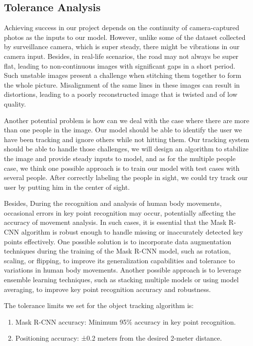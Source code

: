 \subsection{Tolerance Analysis}
Achieving success in our project depends on the continuity of camera-captured photos as the inputs to our model. However, unlike some of the dataset collected by surveillance camera, which is super steady, there might be vibrations in our camera input. Besides, in real-life scenarios, the road may not always be super flat, leading to non-continuous images with significant gaps in a short period. Such unstable images present a challenge when stitching them together to form the whole picture. Misalignment of the same lines in these images can result in distortions, leading to a poorly reconstructed image that is twisted and of low quality.

Another potential problem is how can we deal with the case where there are more than one people in the image. Our model should be able to identify the user we have been tracking and ignore others while not hitting them. Our tracking system should be able to handle those challenges, we will design an algorithm to stabilize the image and provide steady inputs to model, and as for the multiple people case, we think one possible approach is to train our model with test cases with several people. After correctly labeling the people in sight, we could try track our user by putting him in the center of sight.

Besides, During the recognition and analysis of human body movements, occasional errors in key point recognition may occur, potentially affecting the accuracy of movement analysis. In such cases, it is essential that the Mask R-CNN algorithm is robust enough to handle missing or inaccurately detected key points effectively. One possible solution is to incorporate data augmentation techniques during the training of the Mask R-CNN model, such as rotation, scaling, or flipping, to improve its generalization capabilities and tolerance to variations in human body movements. Another possible approach is to leverage ensemble learning techniques, such as stacking multiple models or using model averaging, to improve key point recognition accuracy and robustness. 

The tolerance limits we set for the object tracking algorithm is:
\begin{enumerate}
    \item Mask R-CNN accuracy: Minimum 95\% accuracy in key point recognition.
    \item Positioning accuracy: ±0.2 meters from the desired 2-meter distance.
\end{enumerate}

\newpage